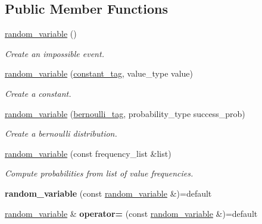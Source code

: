 \subsection*{Public Member Functions}
\begin{DoxyCompactItemize}
\item 
\mbox{\hyperlink{classdice_1_1random__variable_a7cf5a4706aebdb1d8d1fd362491df895}{random\+\_\+variable}} ()
\begin{DoxyCompactList}\small\item\em Create an impossible event. \end{DoxyCompactList}\item 
\mbox{\hyperlink{classdice_1_1random__variable_a50f56529bf017dbdc074f98ac6b9ac55}{random\+\_\+variable}} (\mbox{\hyperlink{classdice_1_1constant__tag}{constant\+\_\+tag}}, value\+\_\+type value)
\begin{DoxyCompactList}\small\item\em Create a constant. \end{DoxyCompactList}\item 
\mbox{\hyperlink{classdice_1_1random__variable_a96f7d3bfb204d1b213c1e004132492ee}{random\+\_\+variable}} (\mbox{\hyperlink{classdice_1_1bernoulli__tag}{bernoulli\+\_\+tag}}, probability\+\_\+type success\+\_\+prob)
\begin{DoxyCompactList}\small\item\em Create a bernoulli distribution. \end{DoxyCompactList}\item 
\mbox{\hyperlink{classdice_1_1random__variable_ae60bac2f1326a03ced717a4f0ff12513}{random\+\_\+variable}} (const frequency\+\_\+list \&list)
\begin{DoxyCompactList}\small\item\em Compute probabilities from list of value frequencies. \end{DoxyCompactList}\item 
\mbox{\label{classdice_1_1random__variable_acf84e1446bdebc2be61df6dddf23926f}} 
{\bfseries random\+\_\+variable} (const \mbox{\hyperlink{classdice_1_1random__variable}{random\+\_\+variable}} \&)=default
\item 
\mbox{\label{classdice_1_1random__variable_a08f007500cac0eec18ec07b117be8662}} 
\mbox{\hyperlink{classdice_1_1random__variable}{random\+\_\+variable}} \& {\bfseries operator=} (const \mbox{\hyperlink{classdice_1_1random__variable}{random\+\_\+variable}} \&)=default

\end{DoxyCompactItemize}
